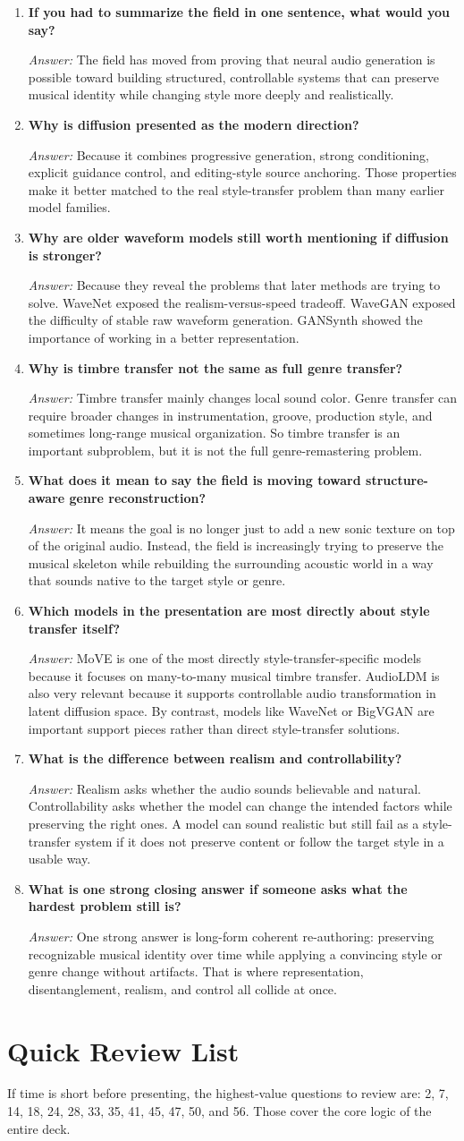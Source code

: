 \documentclass[11pt]{article}
\newcommand{\qa}[2]{
\item \textbf{#1}

\textit{Answer:} #2
}
\begin{document}
\begin{enumerate}[start=49]
\qa{If you had to summarize the field in one sentence, what would you say?}{
The field has moved from proving that neural audio generation is possible toward building structured, controllable systems that can preserve musical identity while changing style more deeply and realistically.
}

\qa{Why is diffusion presented as the modern direction?}{
Because it combines progressive generation, strong conditioning, explicit guidance control, and editing-style source anchoring. Those properties make it better matched to the real style-transfer problem than many earlier model families.
}

\qa{Why are older waveform models still worth mentioning if diffusion is stronger?}{
Because they reveal the problems that later methods are trying to solve. WaveNet exposed the realism-versus-speed tradeoff. WaveGAN exposed the difficulty of stable raw waveform generation. GANSynth showed the importance of working in a better representation.
}

\qa{Why is timbre transfer not the same as full genre transfer?}{
Timbre transfer mainly changes local sound color. Genre transfer can require broader changes in instrumentation, groove, production style, and sometimes long-range musical organization. So timbre transfer is an important subproblem, but it is not the full genre-remastering problem.
}

\qa{What does it mean to say the field is moving toward structure-aware genre reconstruction?}{
It means the goal is no longer just to add a new sonic texture on top of the original audio. Instead, the field is increasingly trying to preserve the musical skeleton while rebuilding the surrounding acoustic world in a way that sounds native to the target style or genre.
}

\qa{Which models in the presentation are most directly about style transfer itself?}{
MoVE is one of the most directly style-transfer-specific models because it focuses on many-to-many musical timbre transfer. AudioLDM is also very relevant because it supports controllable audio transformation in latent diffusion space. By contrast, models like WaveNet or BigVGAN are important support pieces rather than direct style-transfer solutions.
}

\qa{What is the difference between realism and controllability?}{
Realism asks whether the audio sounds believable and natural. Controllability asks whether the model can change the intended factors while preserving the right ones. A model can sound realistic but still fail as a style-transfer system if it does not preserve content or follow the target style in a usable way.
}

\qa{What is one strong closing answer if someone asks what the hardest problem still is?}{
One strong answer is long-form coherent re-authoring: preserving recognizable musical identity over time while applying a convincing style or genre change without artifacts. That is where representation, disentanglement, realism, and control all collide at once.
}
\end{enumerate}

\section*{Quick Review List}
If time is short before presenting, the highest-value questions to review are: 2, 7, 14, 18, 24, 28, 33, 35, 41, 45, 47, 50, and 56. Those cover the core logic of the entire deck.
\end{document}
